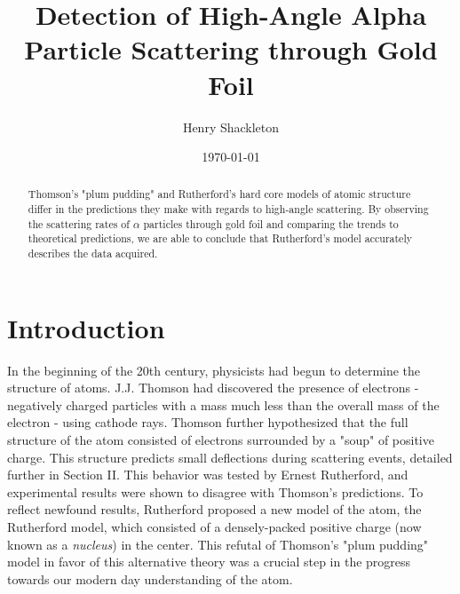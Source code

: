 \usepackage{graphicx}      %
\usepackage{lipsum}
\usepackage{float}
\usepackage{bm}            %
\usepackage{physics}
\usepackage{tensor}
\usepackage{gensymb}
\usepackage[colorlinks=true]{hyperref}  %




\title{Detection of High-Angle Alpha Particle Scattering through Gold Foil}
\author{Henry Shackleton}
\date{\today}


\begin{abstract}
  Thomson's "plum pudding" and Rutherford's hard core models of atomic structure differ in the predictions they make with regards to high-angle scattering. By observing the scattering rates of $\alpha$ particles through gold foil and comparing the trends to theoretical predictions, we are able to conclude that Rutherford's model accurately describes the data acquired.
\end{abstract}

\maketitle
\section{Introduction}
In the beginning of the 20th century, physicists had begun to determine the structure of atoms. J.J. Thomson had discovered the presence of electrons - negatively charged particles with a mass much less than the overall mass of the electron - using cathode rays\cite{electron}. Thomson further hypothesized that the full structure of the atom consisted of electrons surrounded by a "soup" of positive charge. This structure predicts small deflections during scattering events, detailed further in Section II. This behavior was tested by Ernest Rutherford, and experimental results were shown to disagree with Thomson's predictions. To reflect newfound results, Rutherford proposed a new model of the atom, the Rutherford model, which consisted of a densely-packed positive charge (now known as a \textit{nucleus}) in the center. This refutal of Thomson's "plum pudding" model in favor of this alternative theory  was a crucial step in the progress towards our modern day understanding of the atom.

